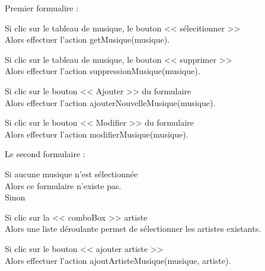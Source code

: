 			\begin{paragraphe}
				Premier formualire :
			\end{paragraphe}

			\begin{paragraphe}
				Si clic sur le tableau de musique, le bouton << sélecitionner >> \\
				Alors effectuer l'action getMusique(musique).
			\end{paragraphe}

			\begin{paragraphe}
				Si clic sur le tableau de musique, le bouton << supprimer >> \\
				Alors effectuer l'action suppressionMusique(musique).
			\end{paragraphe}

			\begin{paragraphe}
				Si clic sur le bouton << Ajouter >> du formulaire \\
				Alors effectuer l'action ajouterNouvelleMusique(musique).
			\end{paragraphe}

			\begin{paragraphe}
				Si clic sur le bouton << Modifier >> du formulaire \\
				Alors effectuer l'action modifierMusique(musique).
			\end{paragraphe}

			\begin{paragraphe}
				Le second formulaire :
			\end{paragraphe}

			\begin{paragraphe}
				Si aucune musique n'est sélectionnée \\
				Alors ce formulaire n'existe pas. \\
				Sinon
			\end{paragraphe}

			\begin{paragraphe}
				Si clic sur la << comboBox >> artiste \\
				Alors une liste déroulante permet de sélectionner les artistes existants.
			\end{paragraphe}

			\begin{paragraphe}
				Si clic sur le bouton << ajouter artiste >> \\
				Alors effectuer l'action ajoutArtisteMusique(musique, artiste).
			\end{paragraphe}

